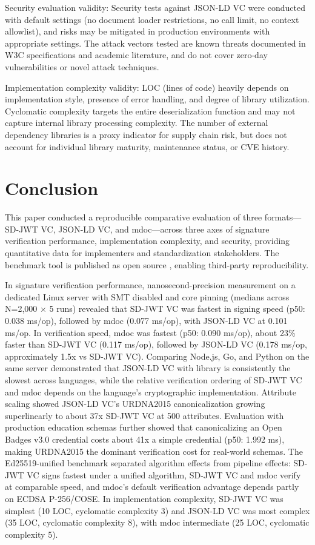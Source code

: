 \documentclass[conference]{IEEEtran}
\begin{document}
Security evaluation validity: Security tests against JSON-LD VC were conducted with default settings (no document loader restrictions, no call limit, no context allowlist), and risks may be mitigated in production environments with appropriate settings. The attack vectors tested are known threats documented in W3C specifications and academic literature, and do not cover zero-day vulnerabilities or novel attack techniques.

Implementation complexity validity: LOC (lines of code) heavily depends on implementation style, presence of error handling, and degree of library utilization. Cyclomatic complexity targets the entire deserialization function and may not capture internal library processing complexity. The number of external dependency libraries is a proxy indicator for supply chain risk, but does not account for individual library maturity, maintenance status, or CVE history.

\section{Conclusion}

This paper conducted a reproducible comparative evaluation of three formats---SD-JWT VC, JSON-LD VC, and mdoc---across three axes of signature verification performance, implementation complexity, and security, providing quantitative data for implementers and standardization stakeholders. The benchmark tool is published as open source \cite{ref14}, enabling third-party reproducibility.

In signature verification performance, nanosecond-precision measurement on a dedicated Linux server with SMT disabled and core pinning (medians across N=2,000 $\times$ 5 runs) revealed that SD-JWT VC was fastest in signing speed (p50: 0.038 ms/op), followed by mdoc (0.077 ms/op), with JSON-LD VC at 0.101 ms/op. In verification speed, mdoc was fastest (p50: 0.090 ms/op), about 23\% faster than SD-JWT VC (0.117 ms/op), followed by JSON-LD VC (0.178 ms/op, approximately 1.5x vs SD-JWT VC). Comparing Node.js, Go, and Python on the same server demonstrated that JSON-LD VC with library is consistently the slowest across languages, while the relative verification ordering of SD-JWT VC and mdoc depends on the language's cryptographic implementation. Attribute scaling showed JSON-LD VC's URDNA2015 canonicalization growing superlinearly to about 37x SD-JWT VC at 500 attributes. Evaluation with production education schemas further showed that canonicalizing an Open Badges v3.0 credential costs about 41x a simple credential (p50: 1.992 ms), making URDNA2015 the dominant verification cost for real-world schemas. The Ed25519-unified benchmark separated algorithm effects from pipeline effects: SD-JWT VC signs fastest under a unified algorithm, SD-JWT VC and mdoc verify at comparable speed, and mdoc's default verification advantage depends partly on ECDSA P-256/COSE. In implementation complexity, SD-JWT VC was simplest (10 LOC, cyclomatic complexity 3) and JSON-LD VC was most complex (35 LOC, cyclomatic complexity 8), with mdoc intermediate (25 LOC, cyclomatic complexity 5).
\end{document}
